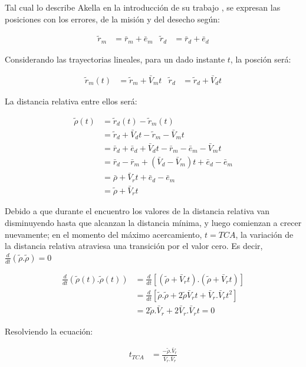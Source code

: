 Tal cual lo describe Akella en la introducci\'on de su trabajo \citep{akellaAlfriend}, se expresan las posiciones con los errores, de la misi\'on y del desecho seg\'un:

\begin{align*}
 \tilde{r}_m &= \bar{r}_m+\bar{e}_m & \tilde{r}_d &= \bar{r}_d+\bar{e}_d 
\end{align*}

Considerando las trayectorias lineales, para un dado instante $t$, la posci\'on ser\'a:

\begin{align*}
 \tilde{r}_m(t) &= \tilde{r}_m+ \bar{V}_m t& \tilde{r}_d &= \tilde{r}_d+\bar{V}_d t 
\end{align*}

La distancia relativa entre ellos ser\'a:

\begin{align*}
 \tilde{\rho}(t) &= \tilde{r}_d(t)-\tilde{r}_m(t) \\
  &=\tilde{r}_d+\bar{V}_d t-\tilde{r}_m- \bar{V}_m t\\
  &=\bar{r}_d+\bar{e}_d + \bar{V}_d t - \bar{r}_m - \bar{e}_m - \bar{V}_m t\\
  &=\bar{r}_d-\bar{r}_m + (\bar{V}_d-\bar{V}_m)t+\bar{e}_d-\bar{e}_m\\
  &=\bar{\rho} + \bar{V}_rt+\bar{e}_d-\bar{e}_m\\
  &=\tilde{\rho}+\bar{V}_rt
\end{align*}

Debido a que durante el encuentro los valores de la distancia relativa van disminuyendo hasta que alcanzan la distancia m\'inima, y luego comienzan a crecer nuevamente; en el momento del m\'aximo acercamiento, $t=TCA$, la variaci\'on de la distancia relativa atraviesa una transici\'on por el valor cero.
Es decir, $\frac{d}{dt}(\tilde{\rho}.\tilde{\rho})=0$

\begin{align*}
 \frac{d}{dt}(\tilde{\rho}(t).\tilde{\rho}(t))&= \frac{d}{dt}[(\tilde{\rho}+\bar{V}_rt).(\tilde{\rho}+\bar{V}_rt)]\\
 &=\frac{d}{dt}[\tilde{\rho}.\tilde{\rho}+2\tilde{\rho}\bar{V}_rt+\bar{V}_r.\bar{V}_rt^{2}]\\
 &=2\tilde{\rho}.\bar{V}_r+2\bar{V}_r.\bar{V}_rt = 0
\end{align*}

Resolviendo la ecuaci\'on:

\begin{align}\label{eq:ttca}
 t_{TCA}&=\frac{-\tilde{\rho}.\bar{V}_r}{\bar{V}_r.\bar{V}_r}
\end{align}

